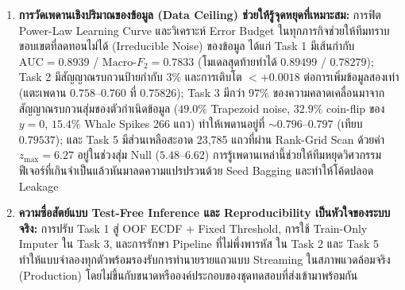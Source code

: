 \begin{enumerate}
  \item \textbf{การวัดเพดานเชิงปริมาณของข้อมูล (Data Ceiling) ช่วยให้รู้จุดหยุดที่เหมาะสม:}
  การฟิต Power-Law Learning Curve และวิเคราะห์ Error Budget ในทุกภารกิจช่วยให้ทีมทราบขอบเขตที่ลดทอนไม่ได้ (Irreducible Noise) ของข้อมูล ได้แก่ Task 1 มีเส้นกำกับ $\text{AUC} = 0.8939$ / $\text{Macro-}F_2 = 0.7833$ (โมเดลสุดท้ายทำได้ $0.89499$ / $0.78279$); Task 2 มีสัญญาณรบกวนป้ายกำกับ $3\%$ และการเติบโต $< +0.0018$ ต่อการเพิ่มข้อมูลสองเท่า (แตะเพดาน $0.758\text{--}0.760$ ที่ $0.75826$); Task 3 มีกว่า $97\%$ ของความคลาดเคลื่อนมาจากสัญญาณรบกวนสุ่มของตัวกำเนิดข้อมูล ($49.0\%$ Trapezoid noise, $32.9\%$ coin-flip ของ $y=0$, $15.4\%$ Whale Spikes 266 แถว) ทำให้เพดานอยู่ที่ $\sim 0.796\text{--}0.797$ (เทียบ $0.79537$); และ Task 5 มีส่วนเหลือสะอาด 23,785 แถวที่ผ่าน Rank-Grid Scan ด้วยค่า $z_{\max} = 6.27$ อยู่ในช่วงสุ่ม Null ($5.48\text{--}6.62$) การรู้เพดานเหล่านี้ช่วยให้ทีมหยุดวิศวกรรมฟีเจอร์ที่เกินจำเป็นแล้วหันมาลดความแปรปรวนด้วย Seed Bagging และทำให้โค้ดปลอด Leakage

  \item \textbf{ความซื่อสัตย์แบบ Test-Free Inference และ Reproducibility เป็นหัวใจของระบบจริง:}
  การปรับ Task 1 สู่ OOF ECDF + Fixed Threshold, การใช้ Train-Only Imputer ใน Task 3, และการรักษา Pipeline ที่ไม่พึ่งพารหัส  ใน Task 2 และ Task 5 ทำให้แบบจำลองทุกตัวพร้อมรองรับการทำนายรายแถวแบบ Streaming ในสภาพแวดล้อมจริง (Production) โดยไม่ขึ้นกับขนาดหรือองค์ประกอบของชุดทดสอบที่ส่งเข้ามาพร้อมกัน
\end{enumerate}

